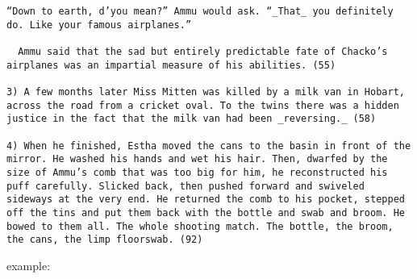 \documentclass[letterpaper]{article}
\begin{document}
\begin{verbatim}
“Down to earth, d’you mean?” Ammu would ask. “_That_ you definitely do. Like your famous airplanes.”

  Ammu said that the sad but entirely predictable fate of Chacko’s airplanes was an impartial measure of his abilities. (55)

3) A few months later Miss Mitten was killed by a milk van in Hobart, across the road from a cricket oval. To the twins there was a hidden justice in the fact that the milk van had been _reversing._ (58)

4) When he finished, Estha moved the cans to the basin in front of the mirror. He washed his hands and wet his hair. Then, dwarfed by the size of Ammu’s comb that was too big for him, he reconstructed his puff carefully. Slicked back, then pushed forward and swiveled sideways at the very end. He returned the comb to his pocket, stepped off the tins and put them back with the bottle and swab and broom. He bowed to them all. The whole shooting match. The bottle, the broom, the cans, the limp floorswab. (92)
\end{verbatim}

example:
\end{document}
